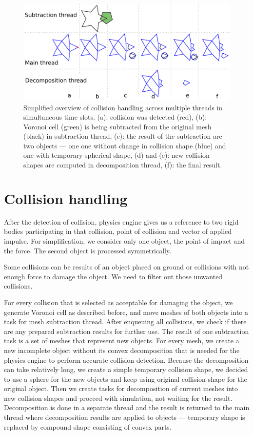 \begin{figure}
        \centering
        \includegraphics[width=\textwidth]{img/object-progress}
       \caption{Simplified overview of collision handling across multiple threads in simultaneous time slots. (a): collision was detected (red), (b): Voronoi cell (green) is being subtracted from the original mesh (black) in subtraction thread, (c): the result of the subtraction are two objects --- one one without change in collision shape (blue) and one with temporary spherical shape, (d) and (e): new collision shapes are computed in decomposition thread, (f): the final result.}
        \label{fig:objectInThreads}
\end{figure}

\section{Collision handling}
\label{sec:collisions}
After the detection of collision, physics engine gives us a reference to two rigid bodies participating in that collision, point of collision and vector of applied impulse. For simplification, we consider only one object, the point of impact and the force. The second object is processed symmetrically.

Some collisions can be results of an object placed on ground or collisions with not enough force to damage the object. We need to filter out those unwanted collisions.

For every collision that is selected as acceptable for damaging the object, we generate Voronoi cell as described before, and move meshes of both objects into a task for mesh subtraction thread. After enqueuing all collisions, we check if there are any prepared subtraction results for further use. The result of one subtraction task is a set of meshes that represent new objects. For every mesh, we create a new incomplete object without its convex decomposition that is needed for the physics engine to perform accurate collision detection. Because the decomposition can take relatively long, we create a simple temporary collision shape, we decided to use a sphere for the new objects and keep using original  collision shape for the original object. Then we create tasks for decomposition of current meshes into new collision shapes and proceed with simulation, not waiting for the result. Decomposition is done in a separate thread and the result is returned to the main thread where decomposition results are applied to objects --- temporary shape is replaced by compound shape consisting of convex parts.

